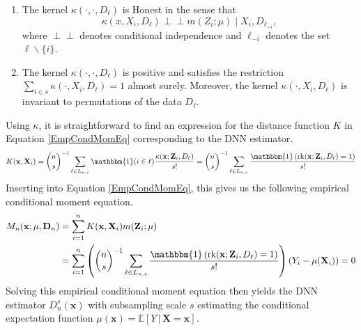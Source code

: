 \documentclass[letterpaper,10pt]{article}
\numberwithin{equation}{section}
\numberwithin{theorem}{section}
\theoremstyle{definition}
\newcommand{\1}{\mathbb{1}}
\newcommand{\indep}{\perp\!\!\!\!\perp}
\begin{document}
\vspace{0.5cm}
\begin{definition}\label{Symmetry_Honesty}
	\begin{enumerate}
		\item The kernel $\kappa\left(\cdot, \cdot, D_{\ell}\right)$ is Honest in the sense that
		      $$\kappa\left(x, X_i, D_{\ell}\right) \indep m\left(Z_i ; \mu\right) \mid X_i, D_{\ell_{-i}},$$
		      where $\indep$ denotes conditional independence and $\ell_{-i}$ denotes the set $\ell \backslash\{i\}$.
		\item The kernel $\kappa\left(\cdot, \cdot, D_{\ell}\right)$ is positive and satisfies the restriction
		      $\sum_{i \in s} \kappa\left(\cdot, X_i, D_{\ell}\right)=1$ almost surely.
		      Moreover, the kernel $\kappa\left(\cdot, X_i, D_{\ell}\right)$ is invariant to permutations of the data $D_{\ell}.$
	\end{enumerate}
\end{definition}
Using $\kappa$, it is straightforward to find an expression for the distance function $K$ in Equation \ref{EmpCondMomEq} corresponding to the DNN estimator.
\begin{equation}
	K(\mathbf{x}, \mathbf{X}_i)
	= \binom{n}{s}^{-1} \sum_{\ell \in L_{n,s}} \mathbbm{1}(i \in \ell)\frac{\kappa(\mathbf{x}; \mathbf{Z}_i, D_{\ell})}{s!}
	= \binom{n}{s}^{-1} \sum_{\ell \in L_{n,s}} \frac{\mathbbm{1}\left(\operatorname{rk}(\mathbf{x}; \mathbf{Z}_i, D_{\ell}) = 1\right)}{s!}
\end{equation}
Inserting into Equation \ref{EmpCondMomEq}, this gives us the following empirical conditional moment equation.
\begin{equation}
	\begin{aligned}
		M_n(\mathbf{x}; \mu, \mathbf{D}_n)
		 & = \sum_{i = 1}^{n}K(\mathbf{x}, \mathbf{X}_i)m(\mathbf{Z}_i; \mu)                                                                                                                                         \\
		 & = \sum_{i = 1}^{n}\left(\binom{n}{s}^{-1} \sum_{\ell \in L_{n,s}} \frac{\mathbbm{1}\left(\operatorname{rk}(\mathbf{x}; \mathbf{Z}_i, D_{\ell}) = 1\right)}{s!}\right)\left(Y_i - \mu(\mathbf{X}_i)\right)
		= 0
	\end{aligned}
\end{equation}
Solving this empirical conditional moment equation then yields the DNN estimator $D_{n}^{s}(\mathbf{x})$ with subsampling scale $s$ estimating the conditional expectation function $\mu(\mathbf{x}) = \mathbb{E}\left[Y \, | \, \mathbf{X} = \mathbf{x}\right]$.
\end{document}
